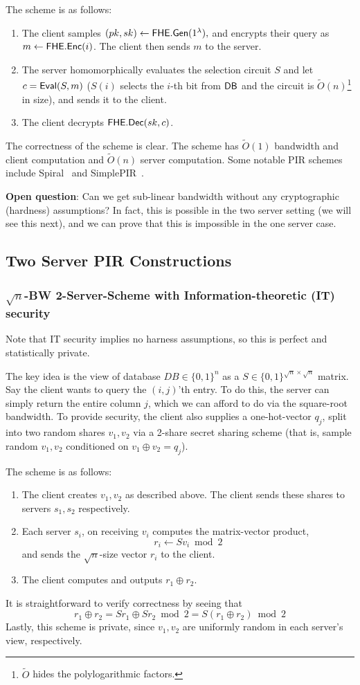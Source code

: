 The scheme is as follows:
\begin{enumerate}
	\item The client samples $(pk,sk) \leftarrow {\sf FHE}.{\sf Gen}(1^\lambda),$ and encrypts their query as $m \leftarrow {\sf FHE}.{\sf Enc}(i)$. The client then sends $m$ to the server.
	\item The server homomorphically evaluates the selection circuit $S$ and let ${c} = {\sf Eval}(S, m)$ ($S(i)$ selects the $i$-th bit from ${\sf DB}$ and the circuit is $\tilde{O}(n)$\footnote{$\tilde{O}$ hides the polylogarithmic factors.} in size), and sends it to the client. 
	\item The client decrypts ${\sf FHE}.{\sf Dec}(sk,c)$.
\end{enumerate}
The correctness of the scheme is clear. The scheme  has $\tilde{O}(1)$ bandwidth and client computation and $\tilde{O}(n)$ server computation. Some notable PIR schemes include Spiral~\cite{spiral} and SimplePIR~\cite{simplepir}.

\textbf{Open question}: Can we get sub-linear bandwidth without any cryptographic (hardness) assumptions? In fact, this is possible in the two server setting (we will see this next), and we can prove that this is impossible in the one server case.

\subsection{Two Server PIR Constructions}
\subsubsection{$\sqrt{n}$-BW 2-Server-Scheme with Information-theoretic (IT) security}
Note that IT security implies no harness assumptions, so this is perfect and statistically private.

The key idea is the view of database $DB \in \{0,1\}^n$ as a $S \in \{0,1\}^{\sqrt{n} \times \sqrt{n}}$ matrix. Say the client wants to query the $(i,j)$'th entry. To do this, the server can simply return the entire column $j$, which we can afford to do via the square-root bandwidth. To provide security, the client also supplies a one-hot-vector $q_j$, split into two random shares $v_{1},v_{2}$ via a 2-share secret sharing scheme (that is, sample random $v_1,v_2$ conditioned on $v_1 \oplus v_2 = q_{j}$).

The scheme is as follows:
\begin{enumerate}
	\item The client creates $v_{1},v_{2}$ as described above. The client sends these shares to servers $s_{1},s_{2}$ respectively.
	\item Each server $s_{i}$, on receiving $v_{i}$ computes the matrix-vector product,
	\[r_{i} \leftarrow S v_{i} \bmod 2\]
	and sends the $\sqrt{n}$-size vector $r_{i}$ to the client.
	\item The client computes and outputs $r_{1} \oplus r_{2}$.
\end{enumerate}
It is straightforward to verify correctness by seeing that
\[r_{1} \oplus r_{2} = S r_{1} \oplus Sr_{2} \bmod 2 = S (r_{1} \oplus r_{2}) \bmod 2\]
Lastly, this scheme is private, since $v_{1},v_{2}$ are uniformly random in each server's view, respectively.

